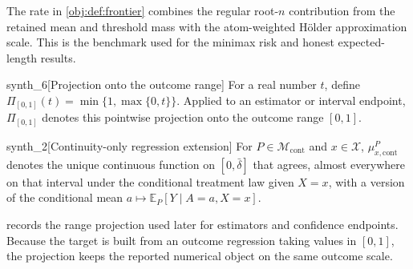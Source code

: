 The rate  in \cref{obj:def:frontier} combines the regular root-\(n\) contribution from the retained mean and threshold mass with the atom-weighted Hölder approximation scale. This is the benchmark used for the minimax risk and honest expected-length results.

\begin{definitionv}{synth_6}[Projection onto the outcome range]
For a real number \(t\), define \(\Pi_{[0,1]}(t)=\min\{1,\max\{0,t\}\}\). Applied to an estimator or interval endpoint, \(\Pi_{[0,1]}\) denotes this pointwise projection onto the outcome range \([0,1]\).
\end{definitionv}

\begin{definitionv}{synth_2}[Continuity-only regression extension]
For \(P\in\mathcal M_{\mathrm{cont}}\) and \(x\in\mathcal X\), \(\mu_{x,\mathrm{cont}}^P\) denotes the unique continuous function on \([0,\bar\delta]\) that agrees, almost everywhere on that interval under the conditional treatment law given \(X=x\), with a version of the conditional mean \(a\mapsto\mathbb E_P[Y\mid A=a,X=x]\).
\end{definitionv}

 records the range projection used later for estimators and confidence endpoints. Because the target is built from an outcome regression taking values in \([0,1]\), the projection keeps the reported numerical object on the same outcome scale.
